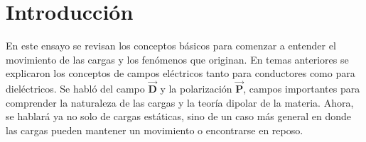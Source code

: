 \section{Introducción}
En este ensayo se revisan los conceptos básicos para comenzar a entender el movimiento de las cargas y los fenómenos que originan. En temas anteriores se explicaron los conceptos de campos eléctricos tanto para conductores como para dieléctricos. Se habló del campo $\vec{\textbf{D}}$ y la polarización $\vec{\textbf{P}}$, campos importantes para comprender la naturaleza de las cargas y la teoría dipolar de la materia. Ahora, se hablará ya no solo de cargas estáticas, sino de un caso más general en donde las cargas pueden mantener un movimiento o encontrarse en reposo.
